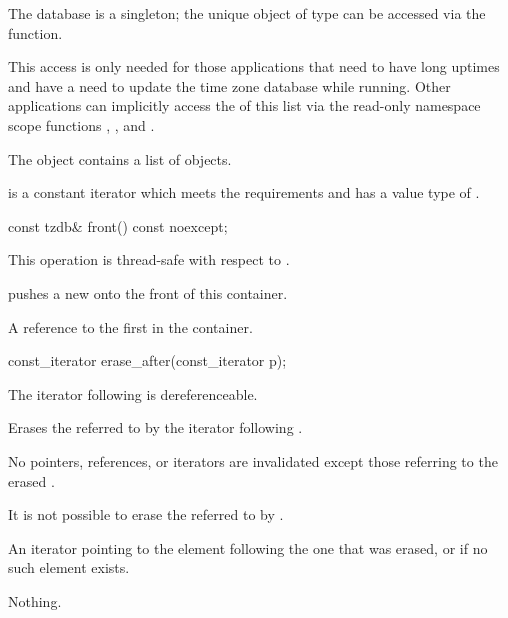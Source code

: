\pnum
The  database is a singleton;
the unique object of type  can be
accessed via the  function.
\begin{note}
This access is only needed for those applications
that need to have long uptimes and
have a need to update the time zone database while running.
Other applications can implicitly access the  of this list
via the read-only namespace scope functions
,
, and
.
\end{note}
The  object contains a list of  objects.

\pnum
{} is a constant iterator
which meets the  requirements
and has a value type of .

%
\begin{itemdecl}
const tzdb& front() const noexcept;
\end{itemdecl}

\begin{itemdescr}
\pnum
\sync
This operation is thread-safe with respect to .
\begin{note}
 pushes a new 
onto the front of this container.
\end{note}

\pnum
\returns
A reference to the first  in the container.
\end{itemdescr}

%
\begin{itemdecl}
const_iterator erase_after(const_iterator p);
\end{itemdecl}

\begin{itemdescr}
\pnum
\expects
The iterator following  is dereferenceable.

\pnum
\effects
Erases the  referred to by the iterator following .

\pnum
\ensures
No pointers, references, or iterators are invalidated
except those referring to the erased .
\begin{note}
It is not possible to erase the 
referred to by .
\end{note}

\pnum
\returns
An iterator pointing to the element following the one that was erased,
or  if no such element exists.

\pnum
\throws
Nothing.
\end{itemdescr}

